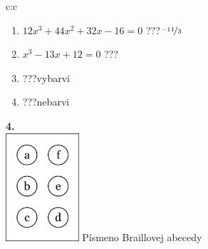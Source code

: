 \documentclass[10pt]{report}
\begin{document}
\begin{tabular}{c:c}
\begin{minipage}[c][99mm][t]{0.49\linewidth}
\begin{center}
\begin{minipage}{0.77\linewidth}
\begin{center}
\begin{varwidth}{\textwidth}
\begin{enumerate}
\item $12x^3+44x^2+32x-16=0$\quad \dotfill\; ???\;\dotfill \quad $\nicefrac{-11}{3}$
\item $x^3-13x+12=0$\quad \dotfill\; ???\;\dotfill {}
\item \quad \dotfill\; ???\;\dotfill \quad vybarvi
\item \quad \dotfill\; ???\;\dotfill \quad nebarvi
\end{enumerate}
\end{varwidth}
\end{center}
\end{minipage}
\begin{minipage}{0.20\linewidth}
\begin{center}
{\Huge\bfseries 4.} \\[2mm]
\includegraphics[height=40mm]{../images/braille.png}
{\small Písmeno Braillovej abecedy}
\end{center}
\end{minipage}
\end{center}
\end{minipage}

\end{tabular}
\clearpage
\thispagestyle{empty}
\end{document}
